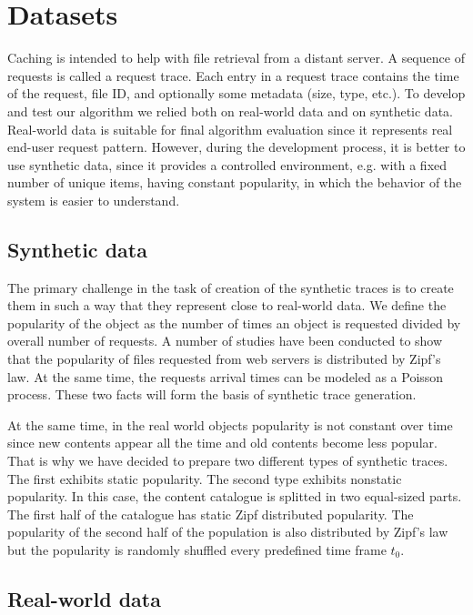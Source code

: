 \section{Datasets} \label{datasets}

Caching is intended to help with file retrieval from a distant server. A sequence of requests is called a request trace. Each entry in a request trace contains the time of the request, file ID, and optionally some metadata (size, type, etc.). To develop and test our algorithm we relied both on real-world data and on synthetic data. Real-world data is suitable for final algorithm evaluation since it represents real end-user request pattern. However, during the development process, it is better to use synthetic data, since it provides a controlled environment, e.g. with a fixed number of unique items, having constant popularity, in which the behavior of the system is easier to understand.

\subsection{Synthetic data} \label{synthetic_data}

The primary challenge in the task of creation of the synthetic traces is to create them in such a way that they represent close to real-world data. We define the popularity of the object as the number of times an  object is requested divided by overall number of requests. A number of studies have been conducted to show that the popularity of files requested from web servers is distributed by Zipf's law\cite{10}. At the same time, the requests arrival times can be modeled as a Poisson process\cite{11}. These two facts will form the basis of synthetic trace generation.

At the same time, in the real world objects popularity is not constant over time since new contents appear all the time and old contents become less popular. That is why we have decided to prepare two different types of synthetic traces. The first exhibits static popularity. The second type exhibits nonstatic popularity. In this case, the content catalogue is splitted in two equal-sized parts. The first half of the catalogue has static Zipf distributed popularity. The popularity of the second half of the population is also distributed by Zipf's law but the popularity is randomly shuffled every predefined time frame $ t_0 $.

\subsection{Real-world data} \label{real_data}

